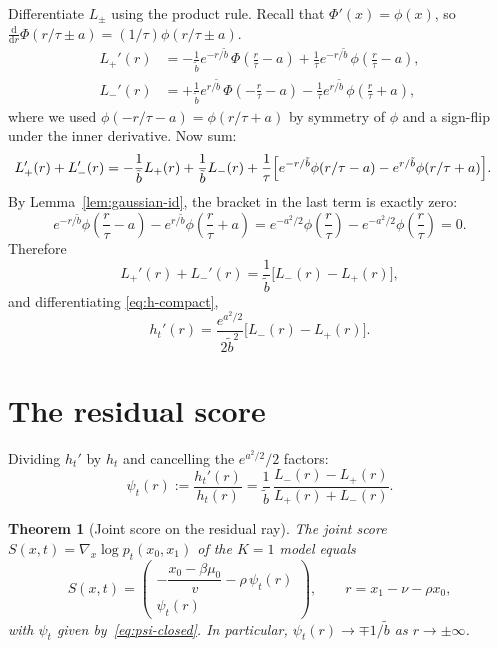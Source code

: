 \documentclass[11pt,a4paper,openany]{book}
\theoremstyle{plainserif}
\newtheorem{theorem}{Theorem}[chapter]
\theoremstyle{definition}
\theoremstyle{remarkstyle}
\newcommand{\btilde}{\tilde{b}}
\begin{document}
Differentiate $L_\pm$ using the product rule. Recall that
$\Phi'(x) = \phi(x)$, so $\frac{\mathrm{d}}{\mathrm{d}r}\Phi(r/\tau \pm a) = (1/\tau)\phi(r/\tau \pm a)$.
\begin{align}
L_+'(r) &= -\frac{1}{\btilde} e^{-r/\btilde}\,\Phi\!\left(\frac{r}{\tau}-a\right)
          + \frac{1}{\tau} e^{-r/\btilde}\,\phi\!\left(\frac{r}{\tau}-a\right),
\label{eq:Lplus-der}\\
L_-'(r) &= +\frac{1}{\btilde} e^{r/\btilde}\,\Phi\!\left(-\frac{r}{\tau}-a\right)
          - \frac{1}{\tau} e^{r/\btilde}\,\phi\!\left(\frac{r}{\tau}+a\right),
\label{eq:Lminus-der}
\end{align}
where we used $\phi(-r/\tau - a) = \phi(r/\tau + a)$ by symmetry of $\phi$
and a sign-flip under the inner derivative.
Now sum:
\begin{align}
L_+'(r) + L_-'(r)
 &= -\frac{1}{\btilde} L_+(r) + \frac{1}{\btilde} L_-(r)
    + \frac{1}{\tau}\Bigl[ e^{-r/\btilde}\phi(r/\tau - a)
       - e^{r/\btilde}\phi(r/\tau + a) \Bigr].
\end{align}
By Lemma~\ref{lem:gaussian-id}, the bracket in the last term is exactly
zero:
\begin{equation}
e^{-r/\btilde}\phi\!\left(\frac{r}{\tau} - a\right)
- e^{r/\btilde}\phi\!\left(\frac{r}{\tau} + a\right)
= e^{-a^2/2}\phi\!\left(\frac{r}{\tau}\right) - e^{-a^2/2}\phi\!\left(\frac{r}{\tau}\right) = 0.
\label{eq:pdf-cancel}
\end{equation}
Therefore
\begin{equation}
L_+'(r) + L_-'(r) = \frac{1}{\btilde}\bigl[L_-(r) - L_+(r)\bigr],
\label{eq:Lplus-plus-Lminus-deriv}
\end{equation}
and differentiating \eqref{eq:h-compact},
\begin{equation}
h_t'(r) = \frac{e^{a^2/2}}{2\btilde^2}\bigl[L_-(r) - L_+(r)\bigr].
\label{eq:hprime-closed}
\end{equation}

\section{The residual score}

Dividing $h_t'$ by $h_t$ and cancelling the $e^{a^2/2}/2$ factors:
\begin{equation}
\psi_t(r) := \frac{h_t'(r)}{h_t(r)} =
\frac{1}{\btilde}\,\frac{L_-(r) - L_+(r)}{L_+(r) + L_-(r)}.
\label{eq:psi-closed}
\end{equation}

\begin{theorem}[Joint score on the residual ray]
\label{thm:score}
The joint score $S(x,t) = \nabla_x \log p_t(x_0, x_1)$ of the $K=1$ model
equals
\begin{equation}
S(x,t) = \begin{pmatrix}
-\dfrac{x_0 - \beta\mu_0}{v} - \rho\,\psi_t(r) \\[4pt]
\psi_t(r)
\end{pmatrix},
\qquad r = x_1 - \nu - \rho x_0,
\label{eq:S-full}
\end{equation}
with $\psi_t$ given by~\eqref{eq:psi-closed}. In particular,
$\psi_t(r) \to \mp 1/\btilde$ as $r\to\pm\infty$.
\end{theorem}
\end{document}
